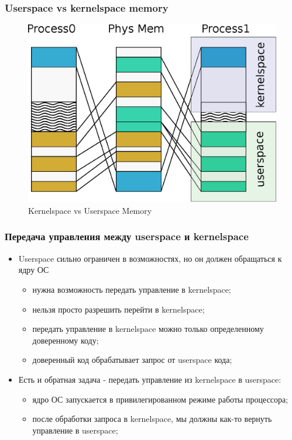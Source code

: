 \begin{frame}
\frametitle{Userspace vs kernelspace memory}
\begin{figure}
  \centering\includegraphics[width=.8\linewidth]{memory}
  \caption{Kernelspace vs Userspace Memory}
\end{figure}
\end{frame}

\begin{frame}
\frametitle{Передача управления между userspace и kernelspace}
\begin{itemize}
  \item<1-> Userspace сильно ограничен в возможностях, но он должен обращаться к ядру ОС
    \begin{itemize}
      \item нужна возможность передать управление в kernelspace;
      \item нельзя просто разрешить перейти в kernelspace;
      \item передать управление в kernelspace можно только определенному доверенному коду;
      \item доверенный код обрабатывает запрос от userspace кода;
    \end{itemize}
  \item<2-> Есть и обратная задача - передать управление из kernelspace в userspace:
    \begin{itemize}
      \item ядро ОС запускается в привилегированном режиме работы процессора;
      \item после обработки запроса в kernelspace, мы должны как-то вернуть управление в userspace;
    \end{itemize}
\end{itemize}
\end{frame}

